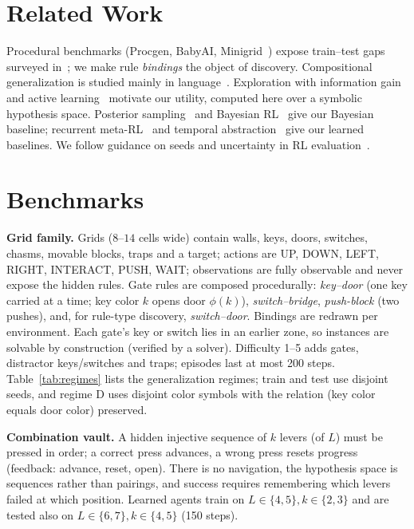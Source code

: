\documentclass[runningheads]{llncs}
\begin{document}
\section{Related Work}
Procedural benchmarks (Procgen, BabyAI, Minigrid~\cite{cobbe2020,chevalier2019,chevalier2023}) expose train--test gaps surveyed in~\cite{kirk2023}; we make rule \emph{bindings} the object of discovery. Compositional generalization is studied mainly in language~\cite{lake2018,keysers2020}. Exploration with information gain~\cite{bellemare2016,pathak2017,houthooft2016} and active learning~\cite{settles2009} motivate our utility, computed here over a symbolic hypothesis space. Posterior sampling~\cite{thompson1933,strens2000,osband2013} and Bayesian RL~\cite{ghavamzadeh2015} give our Bayesian baseline; recurrent meta-RL~\cite{duan2016,wang2016,finn2017,zintgraf2020} and temporal abstraction~\cite{sutton1999} give our learned baselines. We follow guidance on seeds and uncertainty in RL evaluation~\cite{henderson2018,colas2018,agarwal2021}.

\section{Benchmarks}
\textbf{Grid family.} Grids ($8$--$14$ cells wide) contain walls, keys, doors, switches, chasms, movable blocks, traps and a target; actions are UP, DOWN, LEFT, RIGHT, INTERACT, PUSH, WAIT; observations are fully observable and never expose the hidden rules. Gate rules are composed procedurally: \emph{key--door} (one key carried at a time; key color $k$ opens door $\phi(k)$), \emph{switch--bridge}, \emph{push-block} (two pushes), and, for rule-type discovery, \emph{switch--door}. Bindings are redrawn per environment. Each gate's key or switch lies in an earlier zone, so instances are solvable by construction (verified by a solver). Difficulty 1--5 adds gates, distractor keys/switches and traps; episodes last at most 200 steps. Table~\ref{tab:regimes} lists the generalization regimes; train and test use disjoint seeds, and regime D uses disjoint color symbols with the relation (key color equals door color) preserved.

\textbf{Combination vault.} A hidden injective sequence of $k$ levers (of $L$) must be pressed in order; a correct press advances, a wrong press resets progress (feedback: advance, reset, open). There is no navigation, the hypothesis space is sequences rather than pairings, and success requires remembering which levers failed at which position. Learned agents train on $L\in\{4,5\},k\in\{2,3\}$ and are tested also on $L\in\{6,7\},k\in\{4,5\}$ (150 steps).
\end{document}
